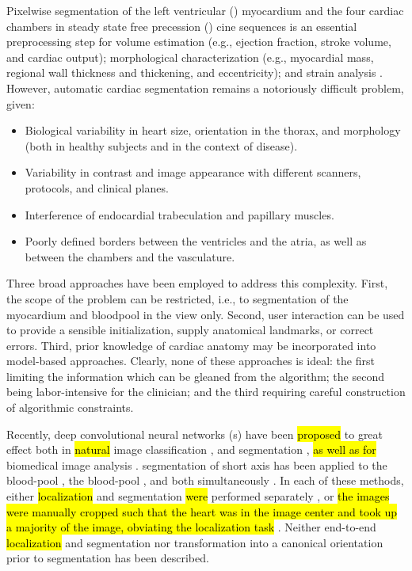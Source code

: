 

Pixelwise segmentation of the left ventricular (\LV{}) myocardium and the four cardiac chambers in  steady state free precession (\SSFP{}) cine sequences is an essential preprocessing step for volume estimation (e.g., ejection fraction, stroke volume, and cardiac output); morphological characterization (e.g., myocardial mass, regional wall thickness and thickening, and eccentricity); and strain analysis \citep{Peng2016}.
However, automatic cardiac segmentation remains a notoriously difficult problem, given:

\begin{itemize}
\item Biological variability in heart size, orientation in the thorax, and morphology (both in healthy subjects and in the context of disease).
\item Variability in contrast and image appearance with different scanners, protocols, and clinical planes.
\item Interference of endocardial trabeculation and papillary muscles.
\item Poorly defined borders between the ventricles and the atria, as well as between the chambers and the vasculature.
\end{itemize}

Three broad approaches have been employed to address this complexity.
First, the scope of the problem can be restricted, i.e., to segmentation of the \LV{} myocardium and bloodpool in the \SA{} view only.
Second, user interaction can be used to provide a sensible initialization, supply anatomical landmarks, or correct errors.
Third, prior knowledge of cardiac anatomy may be incorporated into model-based approaches.  
Clearly, none of these approaches is ideal: the first limiting the information which can be gleaned from the algorithm; the second being labor-intensive for the clinician; and the third requiring careful construction of algorithmic constraints.

Recently, deep convolutional neural networks (\CNN{}s) have been \hl{proposed} to great effect both in \hl{natural} image classification \citep{Krizhevsky2012,Simonyan2015}, and segmentation \citep{Long2015,Noh2015,Yu2016}, \hl{as well as for} biomedical image analysis \citep{Ronneberger2015,Xie2015}.
\CNN{} segmentation of short axis \CMR{} has been applied to the \LV{} blood-pool \citep{Tan2016,Poudel2016a,Tan2017}, the \RV{} blood-pool \citep{Luo2016}, and both simultaneously \citep{Tran2016,Lieman-Sifry2017,Vigneault2017}.
In each of these methods, either \hl{localization} and segmentation \hl{were} performed separately \citep{Tan2016, Poudel2016a, Tan2017, Luo2016}, or \hl{the images were manually cropped such that the heart was in the image center and took up a majority of the image, obviating the \hl{localization} task} \hl{\citep{Tran2016, Lieman-Sifry2017, Vigneault2017}}.
Neither end-to-end \hl{localization} and segmentation nor transformation into a canonical orientation prior to segmentation has been described.

